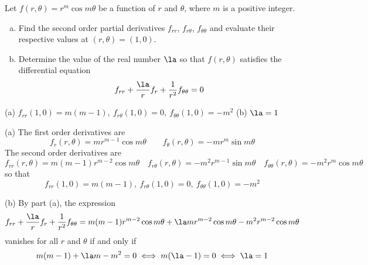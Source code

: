 \begin{question}[M200 2002A] %
 Let $f(r,\theta)=r^m\cos m\theta$ be a function of $r$ and $\theta$,
where $m$ is a positive integer.
\begin{enumerate}[(a)]
\item
 Find the second order partial derivatives $f_{rr}$, $f_{r\theta}$,
$f_{\theta\theta}$ and evaluate their respective values at $(r,\theta)=(1,0)$.

\item
 Determine the value of the real number $\la$ so that $f(r,\theta)$
satisfies the differential equation 
\begin{equation*}
f_{rr}+\frac{\la}{r}f_r+\frac{1}{r^2}f_{\theta\theta}=0
\end{equation*}
\end{enumerate}
\end{question}


\begin{answer}
(a) $f_{rr}(1,0)=m(m-1),\ 
f_{r\theta}(1,0)=0,\ 
f_{\theta\theta}(1,0)=-m^2$\qquad
(b) $\la=1$
\end{answer}

\begin{solution}
(a)
The first order derivatives are
\begin{equation*}
f_r(r,\theta)=mr^{m-1}\cos m\theta\qquad
f_\theta(r,\theta)=-mr^m\sin m\theta
\end{equation*}
The second order derivatives are
\begin{equation*}
f_{rr}(r,\theta)=m(m-1)r^{m-2}\cos m\theta\quad
f_{r\theta}(r,\theta)=-m^2r^{m-1}\sin m\theta\quad
f_{\theta\theta}(r,\theta)=-m^2r^m\cos m\theta
\end{equation*}
so that
\begin{equation*}
f_{rr}(1,0)=m(m-1),\ 
f_{r\theta}(1,0)=0,\ 
f_{\theta\theta}(1,0)=-m^2
\end{equation*}

(b) By part (a), the expression
\begin{equation*}
f_{rr}+\frac{\la}{r}f_r+\frac{1}{r^2}f_{\theta\theta}
=m(m-1)r^{m-2}\cos m\theta+\la mr^{m-2}\cos m\theta-m^2r^{m-2}\cos m\theta
\end{equation*}
vanishes for all $r$ and $\theta$ if and only if 
\begin{equation*}
m(m-1)+\la m-m^2=0\iff m(\la-1)=0\iff \la=1
\end{equation*}
\end{solution}

